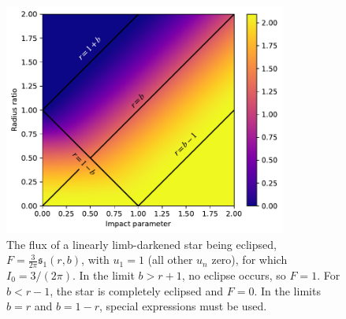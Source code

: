 \documentclass[modern,trackchanges]{aastex63}
\newcommand{\edited}{}
\begin{document}
\begin{figure}[p!]
    \begin{centering}
    \includegraphics[height=3in]{figures/julia/transit_linear.pdf}
    \caption{{\edited The flux of a linearly limb-darkened star being eclipsed, 
    $F = \tfrac{3}{2\pi} \mathfrak{s}_1(r,b)$, with $u_1=1$ (all other $u_n$ zero), 
    for which $I_0 = 3/(2\pi)$.
    In the limit $b > r+1$, no eclipse occurs, so $F=1$.  For $b < r-1$, the star
    is completely eclipsed and $F=0$.  In the limits $b=r$ and $b=1-r$, special
    expressions must be used.}
    \label{transit_linear}}
    \end{centering}
\end{figure}
\end{document}

